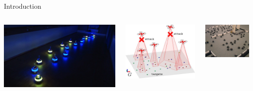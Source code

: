\documentclass[presentation]{beamer}\mode<presentation>{\usetheme{AMSBolognaFC}}
\begin{document}
\begin{frame}[allowframebreaks]{Introduction}
\begin{columns}
	\begin{column}{0.25\textwidth}
		\includegraphics[width=\textwidth]{img/swarm1.jpeg}
	\end{column}
	\begin{column}{0.25\textwidth}
		\includegraphics[width=\textwidth]{img/swarm2.jpeg}
	\end{column}
	\begin{column}{0.25\textwidth}
		\includegraphics[width=\textwidth]{img/swarm3.jpeg}

\end{column}
\end{columns}
\end{frame}
\end{document}
